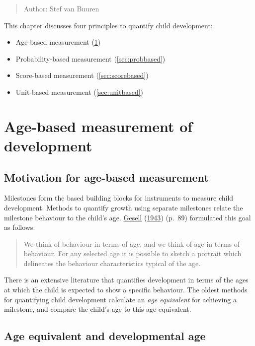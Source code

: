 \documentclass[
]{book}
\providecommand{\tightlist}{%
  \setlength{\itemsep}{0pt}\setlength{\parskip}{0pt}}
\begin{document}
\begin{quote}
Author: Stef van Buuren
\end{quote}

This chapter discusses four principles to quantify child development:

\begin{itemize}
\tightlist
\item
  Age-based measurement (\ref{sec:agebased})
\item
  Probability-based measurement (\ref{sec:probbased})
\item
  Score-based measurement (\ref{sec:scorebased})
\item
  Unit-based measurement (\ref{sec:unitbased})
\end{itemize}

\hypertarget{sec:agebased}{%
\section{Age-based measurement of development}\label{sec:agebased}}

\hypertarget{motivation-for-age-based-measurement}{%
\subsection{Motivation for age-based measurement}\label{motivation-for-age-based-measurement}}

Milestones form the based building blocks for instruments to measure child development. Methods to quantify growth using separate milestones relate the milestone behaviour to the child's age. \protect\hyperlink{ref-gesell1943}{Gesell} (\protect\hyperlink{ref-gesell1943}{1943}) (p.~89) formulated this goal as follows:

\begin{quote}
We think of behaviour in terms of age, and we think of age in terms of behaviour. For any selected age it is possible to sketch a portrait which delineates the behaviour characteristics typical of the age.
\end{quote}

There is an extensive literature that quantifies development in terms of the ages at which the child is expected to show a specific behaviour. The oldest methods for quantifying child development calculate an \emph{age equivalent} for achieving a milestone, and compare the child's age to this age equivalent.

\hypertarget{sec:ageequivalent}{%
\subsection{Age equivalent and developmental age}\label{sec:ageequivalent}}
\end{document}
